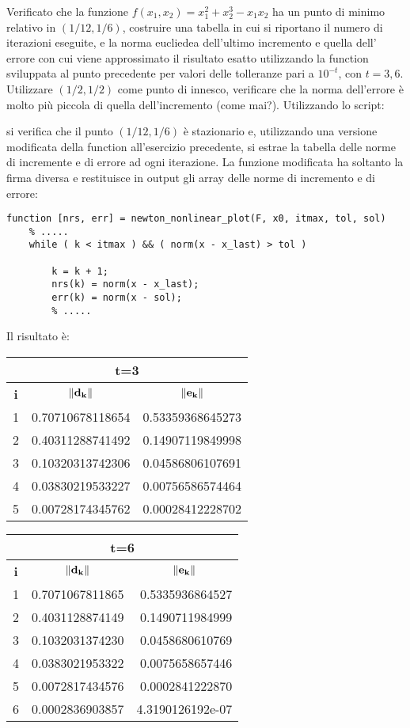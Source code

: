 Verificato che la funzione $f(x_1,x_2) = x_1^2 + x_2^3 - x_1x_2$ ha un punto di minimo relativo in $(1/12, 1/6)$, costruire una tabella in cui si riportano il numero di iterazioni eseguite, e la norma eucliedea dell’ultimo incremento e quella dell’ errore con cui viene approssimato il risultato esatto utilizzando la function sviluppata al punto precedente per valori delle tolleranze pari a $10^{-t}$, con $t=3,6$. Utilizzare $(1/2, 1/2)$ come punto di innesco, verificare che la norma dell'errore è molto più piccola di quella dell'incremento (come mai?).
\PP
Utilizzando lo script:

si verifica che il punto $(1/12, 1/6)$ è stazionario e, utilizzando una versione modificata della function all'esercizio precedente, si estrae la tabella delle norme di incremente e di errore ad ogni iterazione.
La funzione modificata ha soltanto la firma diversa e restituisce in output gli array delle norme di incremento e di errore:
\begin{lstlisting}[frame=single]
	function [nrs, err] = newton_nonlinear_plot(F, x0, itmax, tol, sol)
	% .....
	while ( k < itmax ) && ( norm(x - x_last) > tol )
        
        k = k + 1;
        nrs(k) = norm(x - x_last);
        err(k) = norm(x - sol);
      	% .....
\end{lstlisting}
Il risultato è: \\
\begin{tabular}{|c|r|r|}
	\hline
	\multicolumn{3}{|c|}{\textbf{t=3}}\\
	\hline
	\textbf{i} & \multicolumn{1}{c|}{$\norm{\mathbf{d_k}}$} & \multicolumn{1}{c|}{$\norm{\mathbf{e_k}}$}\\
	\hline
    		1  &   0.70710678118654  &    0.53359368645273  \\
     		2  &   0.40311288741492  &    0.14907119849998  \\
     		3  &   0.10320313742306  &    0.04586806107691  \\
     		4  &   0.03830219533227  &    0.00756586574464  \\
     		5  &   0.00728174345762  &    0.00028412228702 \\
	\hline
\end{tabular}
\begin{tabular}{|c|r|r|}
	\hline
	\multicolumn{3}{|c|}{\textbf{t=6}}\\
	\hline
	\textbf{i} & \multicolumn{1}{c|}{$\norm{\mathbf{d_k}}$} & \multicolumn{1}{c|}{$\norm{\mathbf{e_k}}$}\\
	\hline
		1  &    0.7071067811865  &    0.5335936864527  \\
     		2  &    0.4031128874149  &    0.1490711984999  \\
    	 	3  &    0.1032031374230  &    0.0458680610769  \\
     		4  &    0.0383021953322  &    0.0075658657446 \\
     		5  &    0.0072817434576  &    0.0002841222870  \\
	     	6  &    0.0002836903857  &    4.3190126192e-07  \\
	\hline
\end{tabular}